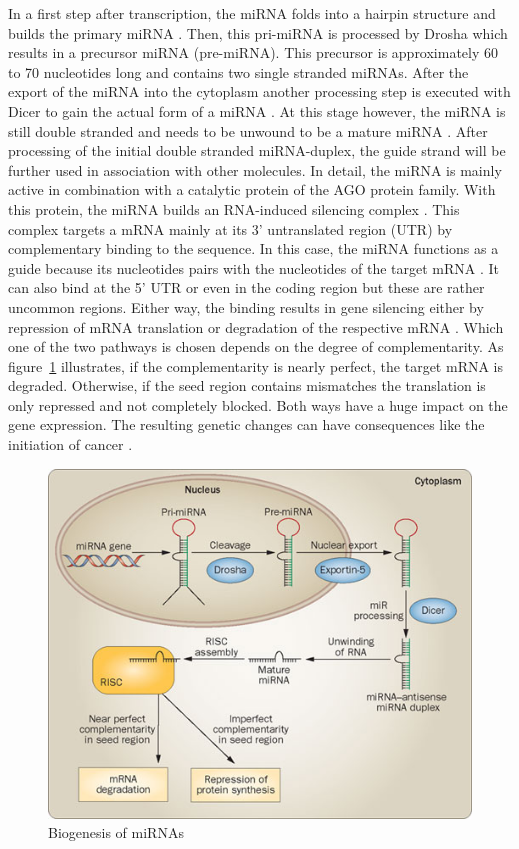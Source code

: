 \documentclass[11pt, a4paper, twoside]{book}
\begin{document}
In a first step after transcription, the miRNA folds into a hairpin structure and builds the primary miRNA \cite{Lee}. Then, this pri-miRNA is processed by Drosha which results in a precursor miRNA (pre-miRNA). This precursor is approximately 60 to 70 nucleotides long and contains two single stranded miRNAs. After the export of the miRNA into the cytoplasm another processing step is executed with Dicer to gain the actual form of a miRNA \cite{Lee}. At this stage however, the miRNA is still double stranded and needs to be unwound to be a mature miRNA \cite{Macfarlane}. After processing of the initial double stranded miRNA-duplex, the guide strand will be further used in association with other molecules. In detail, the miRNA is mainly active in combination with a catalytic protein of the AGO protein family. With this protein, the miRNA builds an RNA-induced silencing complex \cite{Ha}. This complex targets a mRNA mainly at its 3' untranslated region (UTR) by complementary binding to the sequence. In this case, the miRNA functions as a guide because its nucleotides pairs with the nucleotides of the target mRNA \cite{Macfarlane}. It can also bind at the 5' UTR or even in the coding region but these are rather uncommon regions. Either way, the binding results in gene silencing either by repression of mRNA translation or degradation of the respective mRNA \cite{Enright}. Which one of the two pathways is chosen depends on the degree of complementarity. As figure~\ref{biogenesis} illustrates, if the complementarity is nearly perfect, the target mRNA is degraded. Otherwise, if the seed region contains mismatches the translation is only repressed and not completely blocked. Both ways have a huge impact on the gene expression. The resulting genetic changes can have consequences like the initiation of cancer \cite{Macfarlane}.\\

\begin{figure}
\centering
\includegraphics[scale=0.45]{results/biogenesis.png}
\caption{Biogenesis of miRNAs}
\label{biogenesis}
\end{figure}  
\end{document}
